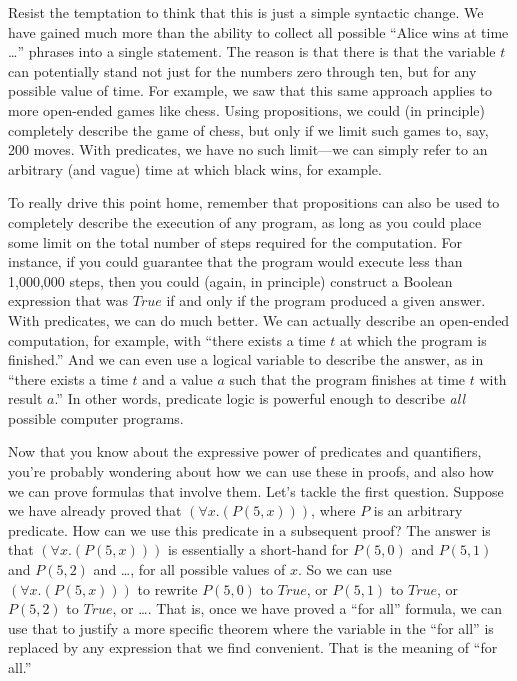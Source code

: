 {{Resist the temptation to think that this is just a simple syntactic change. We have gained much more than the ability to
collect all possible ``Alice wins at time \dots'' phrases into a single statement. The reason is that there is that
the variable $t$ can potentially stand not just for the numbers zero through ten, but for any possible value of time. For example,
we saw that this same approach applies to more open-ended games like chess. Using propositions, we could (in principle)
completely describe the game of chess, but only if we limit such games to, say, 200 moves. With predicates, we have no such
limit---we can simply refer to an arbitrary (and vague) time at which black wins, for example.

To really drive this point home, remember that propositions can also be used to completely describe the execution of any
program, as long as you could place some limit on the total number of steps required for the computation. For instance, if
you could guarantee that the program would execute less than 1,000,000 steps, then you could (again, in principle) construct
a Boolean expression that was $True$ if and only if the program produced a given answer. With predicates, we can do much better.
We can actually describe an open-ended computation, for example, with ``there exists a time $t$ at which the program is finished.'' And
we can even use a logical variable to describe the answer, as in ``there exists a time $t$ and a value $a$ such that the program 
finishes at time $t$ with result $a$.'' In other words, predicate logic is powerful enough to describe \emph{all} possible
computer programs.

Now that you know about the expressive power of predicates and quantifiers, you're probably wondering about how we
can use these in proofs, and also how we can prove formulas that involve them. Let's tackle the first question. Suppose
we have already proved that $(\forall x.(P(5, x)))$, where $P$ is an arbitrary predicate. How can we use this predicate
in a subsequent proof? The answer is that $(\forall x.(P(5, x)))$ is essentially a short-hand for $P(5, 0)$
and $P(5, 1)$ and $P(5, 2)$ and \dots, for all possible values of $x$. So we can use $(\forall x.(P(5, x)))$ to rewrite
$P(5, 0)$ to $True$, or $P(5, 1)$ to $True$, or $P(5, 2)$ to $True$, or \dots. That is, once we have proved a ``for all'' 
formula, we can use that to justify a more specific theorem where the variable in the ``for all'' is replaced by any
expression that we find convenient. That is the meaning of ``for all.''

}}
